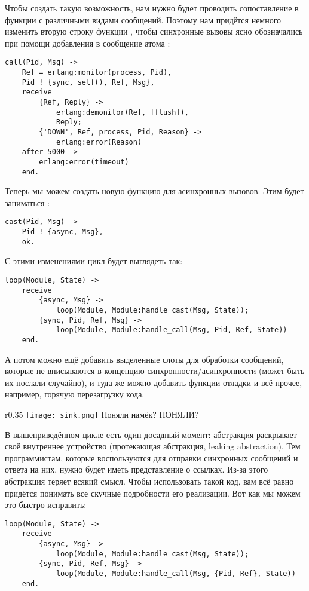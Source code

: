 Чтобы создать такую возможность, нам нужно будет проводить сопоставление  в функции  с различными видами сообщений.
Поэтому нам придётся немного изменить вторую строку функции , чтобы синхронные вызовы ясно обозначались при помощи добавления в сообщение атома :
\begin{lstlisting}[style=erlang]
call(Pid, Msg) ->
    Ref = erlang:monitor(process, Pid),
    Pid ! {sync, self(), Ref, Msg},
    receive
        {Ref, Reply} ->
            erlang:demonitor(Ref, [flush]),
            Reply;
        {'DOWN', Ref, process, Pid, Reason} ->
            erlang:error(Reason)
    after 5000 ->
        erlang:error(timeout)
    end.
\end{lstlisting}

Теперь мы можем создать новую функцию для асинхронных вызовов.
Этим будет заниматься :
\begin{lstlisting}[style=erlang]
cast(Pid, Msg) ->
    Pid ! {async, Msg},
    ok.
\end{lstlisting}
С этими изменениями цикл будет выглядеть так:
\begin{lstlisting}[style=erlang]
loop(Module, State) ->
    receive
        {async, Msg} ->
            loop(Module, Module:handle_cast(Msg, State));
        {sync, Pid, Ref, Msg} ->
            loop(Module, Module:handle_call(Msg, Pid, Ref, State))
    end.
\end{lstlisting}
А потом можно ещё добавить выделенные слоты для обработки сообщений, которые не вписываются в концепцию синхронности/асинхронности (может быть их послали случайно), и туда же можно добавить функции отладки и всё прочее, например, горячую перезагрузку кода.
\begin{wrapfigure}{r}{0.35\linewidth}
    \texttt{[image: sink.png]}
    Поняли намёк? ПОНЯЛИ?
\end{wrapfigure}

В вышеприведённом цикле есть один досадный момент: абстракция раскрывает своё внутреннее устройство (протекающая абстракция, leaking abstraction).
Тем программистам, которые воспользуются  для отправки синхронных сообщений и ответа на них, нужно будет иметь представление о ссылках.
Из\--за этого абстракция теряет всякий смысл.
Чтобы использовать такой код, вам всё равно придётся понимать все скучные подробности его реализации.
Вот как мы можем это быстро исправить:
\begin{lstlisting}[style=erlang]
loop(Module, State) ->
    receive
        {async, Msg} ->
            loop(Module, Module:handle_cast(Msg, State));
        {sync, Pid, Ref, Msg} ->
            loop(Module, Module:handle_call(Msg, {Pid, Ref}, State))
    end.
\end{lstlisting}

